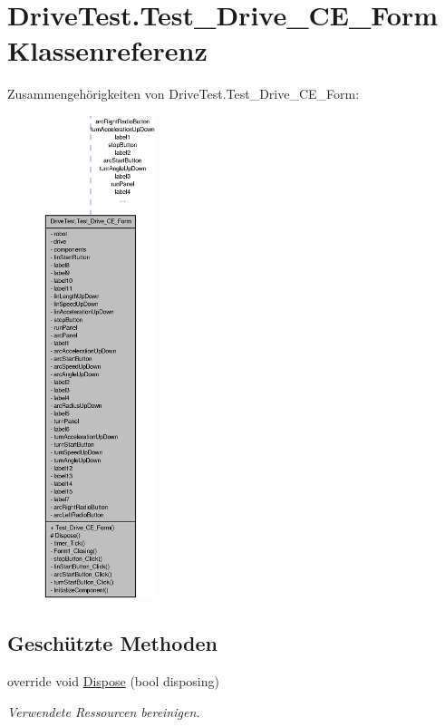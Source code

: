 \hypertarget{class_drive_test_1_1_test___drive___c_e___form}{
\section{DriveTest.Test\_\-Drive\_\-CE\_\-Form Klassenreferenz}
\label{class_drive_test_1_1_test___drive___c_e___form}
}


Zusammengehörigkeiten von DriveTest.Test\_\-Drive\_\-CE\_\-Form:\nopagebreak
\begin{figure}[H]
\begin{center}
\leavevmode
\includegraphics[height=400pt]{class_drive_test_1_1_test___drive___c_e___form__coll__graph}
\end{center}
\end{figure}
\subsection*{Geschützte Methoden}
\begin{DoxyCompactItemize}
\item 
override void \hyperlink{class_drive_test_1_1_test___drive___c_e___form_a584a1f5c6af489c5e76db7246edc3d7b}{Dispose} (bool disposing)
\begin{DoxyCompactList}\small\item\em Verwendete Ressourcen bereinigen. \item\end{DoxyCompactList}\end{DoxyCompactItemize}


